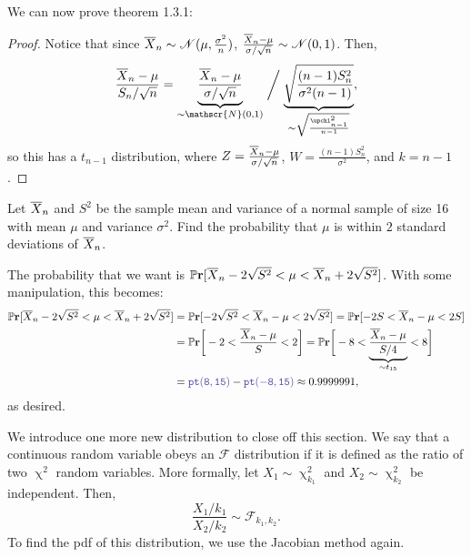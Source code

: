 We can now prove theorem 1.3.1:\begin{proof}
    Notice that since \(\overline{X}_n \sim \mathscr{N}(\mu, \frac{\sigma^2}{n})\), \(\frac{\overline{X}_n - \mu}{\sigma / \sqrt{n}} \sim \mathscr{N}(0,1)\). 
    Then,\begin{align*}
        \frac{\smean - \mu}{S_n /\sqrt{n}} = \underbrace{\frac{\smean - \mu}{\sigma/\sqrt{n}}}_{\sim\mathscr{N}(0,1)}  \biggm/ \underbrace{\sqrt{\frac{(n-1)S_n^2}{\sigma^2 (n-1)}}}_{\sim \sqrt{\frac{\upchi_{n-1}^2}{n-1}}}, 
    \end{align*}so this has a \(t_{n-1}\) distribution, where \(Z = \frac{\overline{X}_n - \mu}{\sigma / \sqrt{n}}\), \(W = \frac{(n-1)S_n^2}{\sigma^2}\), and \(k = n-1\). 
\end{proof}

\begin{example}
    Let \(\overline{X}_n\) and \(S^2\) be the sample mean and variance of a normal sample of size 16 with mean \(\mu\) and variance \(\sigma^2\).
    Find the probability that \(\mu\) is within \(2\) standard deviations of \(\overline{X}_n\). 

    The probability that we want is \(\mathbb{P}\mathbf{r} [\overline{X}_n - 2\sqrt{S^2} < \mu < \overline{X}_n + 2\sqrt{S^2}] \). With some manipulation, this becomes:\begin{align*}
        \Pr [\smean - 2\sqrt{S^2} < \mu < \smean + 2\sqrt{S^2}] & = \Pr [- 2\sqrt{S^2} < \smean - \mu < 2\sqrt{S^2}] = \Pr [ -2S < \smean - \mu < 2S] \\ 
        &= \Pr \bigg[-2 < \frac{\smean - \mu}{S} < 2\bigg] = \Pr \bigg[-8 < \underbrace{\frac{\smean - \mu}{S / 4}}_{\sim t_{15}} < 8\bigg] \\
        &= \code{pt(8,15)} - \code{pt(-8,15)} \approx 0.9999991,
    \end{align*}as desired. 
\end{example}

We introduce one more new distribution to close off this section. 
We say that a continuous random variable obeys an \(\mathscr{F}\) distribution if it is defined as the ratio of two \(\upchi^2\) random variables. 
More formally, let \(X_1 \sim \upchi_{k_1}^2\) and \(X_2\sim\upchi_{k_2}^2\) be independent. 
Then,\[
    \frac{X_1 / k_1}{X_2 / k_2} \sim \mathscr{F}_{k_1, k_2}. 
\]To find the pdf of this distribution, we use the Jacobian method again. 

